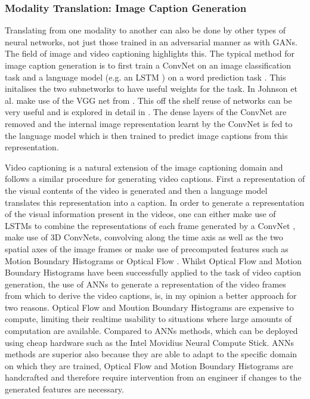 \subsubsection{Modality Translation: Image Caption Generation}
Translating from one modality to another can also be done by other types of neural networks, not just those trained in an adversarial manner as with \acp{GAN}.
The field of image and video captioning highlights this. The typical method for image caption generation is to first train a \ac{ConvNet} on an image classification task and a language model (e.g. an \ac{LSTM} \cite{hochreiter1997long}) on a word prediction task \cite{vinyals2015show, venugopalan2014translating, johnson2016densecap}. This initalises the two subnetworks to have useful weights for the task. In \cite{johnson2016densecap} Johnson et al. make use of the VGG net from \cite{simonyan2014very}. This off the shelf reuse of networks can be very useful and is explored in detail in \cite{keller}.
The dense layers of the \ac{ConvNet} are removed and the internal image representation learnt by the \ac{ConvNet} is fed to the language model which is then trained to predict image captions from this representation.

Video captioning is a natural extension of the image captioning domain and follows a similar procedure for generating video captions. First a representation of the visual contents of the video is generated and then a language model translates this representation into a caption. In order to generate a representation of the visual information  present in the videos, one can either make use of \acp{LSTM} to combine the representations of each frame generated by a \ac{ConvNet} \cite{donahue2015long}, make use of 3D \acp{ConvNet}, convolving along the time axis as well as the two spatial axes of the image frames \cite{yao2015describing, yao2015video} or make use of precomputed features such as Motion Boundary Histograms or Optical Flow \cite{rohrbach2014coherent, rohrbach2013translating}.
Whilst Optical Flow and Motion Boundary Histograms have been successfully applied to the task of video caption generation, the use of \acp{ANN} to generate a representation of the video frames from which to derive the video captions, is, in my opinion a better approach for two reasons. Optical Flow and Moution Boundary Histograms are expensive to compute, limiting their realtime usability to situations where large amounts of computation are available. Compared to \acp{ANN} methods, which can be deployed using cheap hardware such as the Intel Movidius Neural Compute Stick. \acp{ANN} methods are superior also because they are able to adapt to the specific domain on which they are trained, Optical Flow and Motion Boundary Histograms are handcrafted and therefore require intervention from an engineer if changes to the generated features are necessary.

